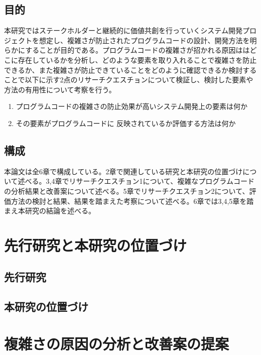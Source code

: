 \documentclass[11pt, a4paper]{jreport}
\begin{document}
\section{目的}
本研究ではステークホルダーと継続的に価値共創を行っていくシステム開発プロジェクトを想定し、複雑さが防止されたプログラムコードの設計、開発方法を明らかにすることが目的である。プログラムコードの複雑さが招かれる原因ははどこに存在しているかを分析し、どのような要素を取り入れることで複雑さを防止できるか、また複雑さが防止できていることをどのように確認できるか検討することで以下に示す2点のリサーチクエスチョンについて検証し、検討した要素や方法の有用性について考察を行う。
\begin{enumerate}
\item プログラムコードの複雑さの防止効果が高いシステム開発上の要素は何か
\item その要素がプログラムコードに
反映されているか評価する方法は何か
\end{enumerate}
\section{構成}
本論文は全6章で構成している。2章で関連している研究と本研究の位置づけについて述べる。3,4章でリサーチクエスチョン1について、複雑なプログラムコードの分析結果と改善案について述べる。5章でリサーチクエスチョン2について、評価方法の検討と結果、結果を踏まえた考察について述べる。6章では3,4,5章を踏まえ本研究の結論を述べる。
\chapter{先行研究と本研究の位置づけ}
\section{先行研究}
\subsection{}
\subsection{}
\section{本研究の位置づけ}
\chapter{複雑さの原因の分析と改善案の提案}
\end{document}
